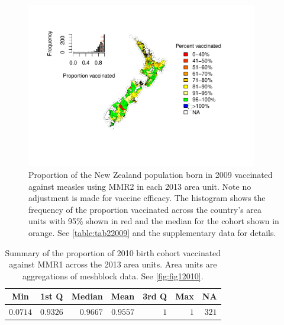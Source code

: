 \documentclass{article}
\begin{document}
\begin{figure}
\begin{center}
    \includegraphics[width=0.9\textwidth]{nir_census_MMR2_NIR_2009.pdf}
 \end{center}
    \caption{Proportion of the New Zealand population born in 2009 vaccinated against measles using MMR2 in each 2013 area unit. Note no adjustment is made for vaccine efficacy. The histogram shows the frequency of the proportion vaccinated across the country's area units with 95\% shown in red and the median for the cohort shown in orange. See \autoref{table:tab22009} and the supplementary data for details.}
\label{fig:fig22009}
\end{figure}

 \vspace{5mm} %
\begin{table}
\begin{center}
\begin{tabular}{rrrrrrr}
\hline\hline
\multicolumn{1}{c}{Min}&\multicolumn{1}{c}{1st Q}&\multicolumn{1}{c}{Median}&\multicolumn{1}{c}{Mean}&\multicolumn{1}{c}{3rd Q}&\multicolumn{1}{c}{Max}&\multicolumn{1}{c}{NA}\tabularnewline
\hline
$0.0714$&$0.9326$&$0.9667$&$0.9557$&$1$&$1$&$321$\tabularnewline
\hline
\end{tabular}\end{center}\caption{Summary of the proportion of 2010 birth cohort vaccinated against MMR1 across the 2013 area units. Area units are aggregations of meshblock data. See \autoref{fig:fig12010}.}
\label{table:tab12010}
\end{table}
\end{document}
